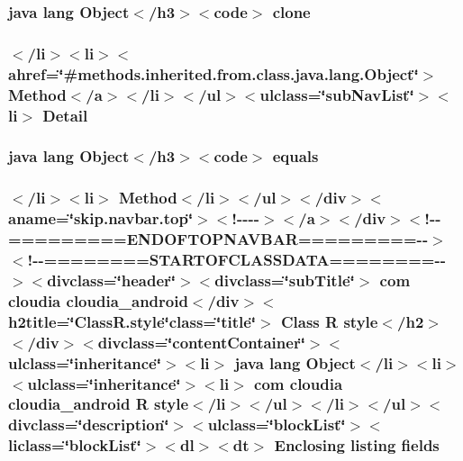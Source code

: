 \hypertarget{_r_8style_8html_adc9607fcabf6f2d7f401ad52015ef6e0}{
\subsubsection[{clone}]{\setlength{\rightskip}{0pt plus 5cm}java lang Object$<$/h3$>$$<$code$>$ clone}}\label{_r_8style_8html_adc9607fcabf6f2d7f401ad52015ef6e0}
\hypertarget{_r_8style_8html_aed0df2ae11502bf9389ac3cf53b1c0f6}{
\subsubsection[{Detail}]{\setlength{\rightskip}{0pt plus 5cm}$<$/li$>$$<$li$>$$<$ahref=\char`\"{}\#methods.\-inherited.\-from.\-class.\-java.\-lang.\-Object\char`\"{}$>$ Method$<$/{\bf a}$>$$<$/li$>$$<$/ul$>$$<$ulclass=\char`\"{}sub\-Nav\-List\char`\"{}$>$$<$li$>$ Detail}}\label{_r_8style_8html_aed0df2ae11502bf9389ac3cf53b1c0f6}
\hypertarget{_r_8style_8html_a8974318cea585f72df717e0380ec7104}{
\subsubsection[{equals}]{\setlength{\rightskip}{0pt plus 5cm}java lang Object$<$/h3$>$$<$code$>$ equals}}\label{_r_8style_8html_a8974318cea585f72df717e0380ec7104}
\hypertarget{_r_8style_8html_afd37662da3d7ed7360bf6b47123a9dec}{
\subsubsection[{fields}]{\setlength{\rightskip}{0pt plus 5cm}$<$/li$>$$<$li$>$ Method$<$/li$>$$<$/ul$>$$<$/div$>$$<$aname=\char`\"{}skip.\-navbar.\-top\char`\"{}$>$$<$!-\/-\/-\/-\/$>$$<$/a$>$$<$/div$>$$<$!-\/-\/=========E\-N\-D\-O\-F\-T\-O\-P\-N\-A\-V\-B\-A\-R=========-\/-\/$>$$<$!-\/-\/========S\-T\-A\-R\-T\-O\-F\-C\-L\-A\-S\-S\-D\-A\-T\-A========-\/-\/$>$$<$divclass=\char`\"{}header\char`\"{}$>$$<$divclass=\char`\"{}sub\-Title\char`\"{}$>$ com cloudia cloudia\-\_\-android$<$/div$>$$<$h2title=\char`\"{}Class\-R.\-style\char`\"{}class=\char`\"{}title\char`\"{}$>$ Class {\bf R} {\bf style}$<$/h2$>$$<$/div$>$$<$divclass=\char`\"{}content\-Container\char`\"{}$>$$<$ulclass=\char`\"{}inheritance\char`\"{}$>$$<$li$>$ java lang Object$<$/li$>$$<$li$>$$<$ulclass=\char`\"{}inheritance\char`\"{}$>$$<$li$>$ com cloudia cloudia\-\_\-android {\bf R} {\bf style}$<$/li$>$$<$/ul$>$$<$/li$>$$<$/ul$>$$<$divclass=\char`\"{}description\char`\"{}$>$$<$ulclass=\char`\"{}block\-List\char`\"{}$>$$<$liclass=\char`\"{}block\-List\char`\"{}$>$$<$dl$>$$<${\bf dt}$>$ Enclosing listing fields}}\label{_r_8style_8html_afd37662da3d7ed7360bf6b47123a9dec}
